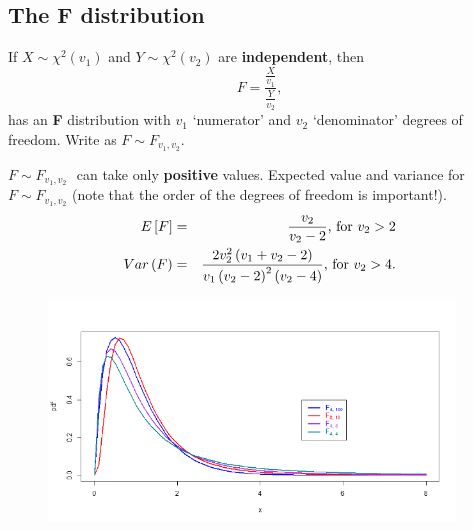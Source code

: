 \documentclass[smaller]{beamer}\usepackage[]{graphicx}\usepackage[]{color}
\begin{document}
\subsection{The F distribution}

\begin{frame}{\subsecname}
  \begin{definition}
  If $X\sim \chi ^{2}(v_{1})$ and $Y\sim \chi ^{2}(v_{2})$ are \textbf{%
  independent}, then%
  \begin{equation*}
  F=\frac{\frac{X}{v_{1}}}{\frac{Y}{v_{2}}},
  \end{equation*}%
  has an \textbf{F} distribution with $v_{1}$ `numerator' and $v_{2}$
  `denominator' degrees of freedom. Write as $F\sim F_{v_{1},v_{2}}$.
  \end{definition}

  $F\sim F_{v_{1},v_{2}}\,$\ can take only \textbf{positive }values. Expected value and variance for $F\sim F_{v_{1},v_{2}}$ (note that the order of the degrees of freedom is important!).
  \begin{eqnarray*}
  E\left[ F\right] &=&\frac{v_{2}}{v_{2}-2}\text{, for }v_{2}>2 \\
  Var\left( F\right) &=&\frac{2v_{2}^{2}\left( v_{1}+v_{2}-2\right) }{%
  v_{1}\left( v_{2}-2\right) ^{2}\left( v_{2}-4\right) }\text{, for }v_{2}>4.
  \end{eqnarray*}
\end{frame}

\begin{frame}{\subsecname}

  \begin{figure}[ptb]\centering
  \includegraphics[height=2.3324in, width=4.2462in]{img/F-dist_pds__6.pdf}%
  \end{figure}%
\end{frame}%
\end{document}
